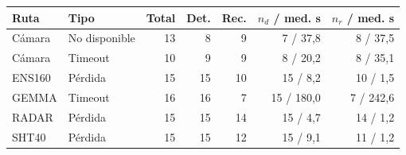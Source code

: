 \begin{tabular}{llrrrrr}
\hline
Ruta & Tipo & Total & Det. & Rec. & $n_d$ / med. s & $n_r$ / med. s \\
\hline
Cámara & No disponible & 13 & 8 & 9 & 7 / 37{,}8 & 8 / 37{,}5 \\
Cámara & Timeout & 10 & 9 & 9 & 8 / 20{,}2 & 8 / 35{,}1 \\
ENS160 & Pérdida & 15 & 15 & 10 & 15 / 8{,}2 & 10 / 1{,}5 \\
GEMMA & Timeout & 16 & 16 & 7 & 15 / 180{,}0 & 7 / 242{,}6 \\
RADAR & Pérdida & 15 & 15 & 14 & 15 / 4{,}7 & 14 / 1{,}2 \\
SHT40 & Pérdida & 15 & 15 & 12 & 15 / 9{,}1 & 11 / 1{,}2 \\
\hline
\end{tabular}

